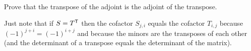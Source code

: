 
\begin{Exercise}[
name={},
title={}, 
difficulty=0,
origin={\cite{JH}}]
Prove that the transpose of the adjoint is the adjoint of the transpose.
\end{Exercise}

\begin{Answer}
     Just note that if $S={{T}^{\mathsf{T}}}$ then the cofactor
      $S_{j,i}$ equals the cofactor $T_{i,j}$ because $(-1)^{j+i}=(-1)^{i+j}$
      and because the minors are the transposes of each other (and the
      determinant of a transpose equals the determinant of the matrix).
\end{Answer}
